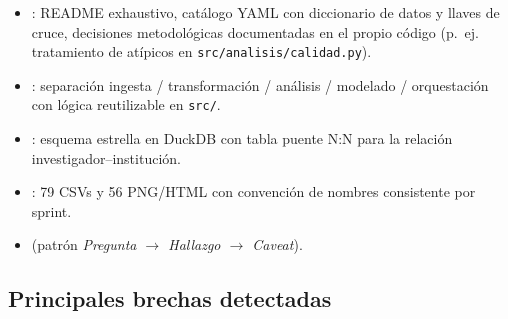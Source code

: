 \begin{itemize}
  \item {}: README exhaustivo, catálogo
        YAML con diccionario de datos y llaves de cruce, decisiones metodológicas
        documentadas en el propio código (p.~ej. tratamiento de atípicos en
        \texttt{src/analisis/calidad.py}).
  \item {}: separación ingesta / transformación /
        análisis / modelado / orquestación con lógica reutilizable en \texttt{src/}.
  \item {}: esquema estrella en DuckDB con
        tabla puente N:N para la relación investigador--institución.
  \item {}: 79 CSVs y 56 PNG/HTML con convención de
        nombres consistente por sprint.
  \item {} (patrón \emph{Pregunta $\rightarrow$ Hallazgo $\rightarrow$ Caveat}).
\end{itemize}

\subsection{Principales brechas detectadas}

